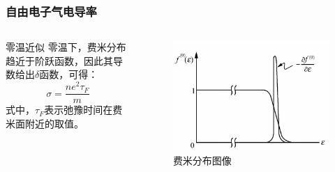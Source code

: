 \documentclass{if-beamer}
\begin{document}
\begin{frame}
    \frametitle{自由电子气电导率}
    \begin{columns}
\begin{column}{0.5\textwidth}
    \begin{block}{零温近似}
        零温下，费米分布趋近于阶跃函数，因此其导数给出$\delta$函数，可得：
    \begin{equation*}
        \sigma=\frac{n e^{2} \tau_{F}}{m}
    \end{equation*}     
    式中，$\tau_{F}$表示弛豫时间在费米面附近的取值。
    \end{block}
\end{column}

        
        \begin{column}{0.5\textwidth}
        
            \begin{figure}
                \centering
                \includegraphics[scale=0.25]{image-20190529174507329.png}
                \caption{费米分布图像}
                \end{figure}
        
        \end{column}
        
        \end{columns}
    
\end{frame}
\end{document}
